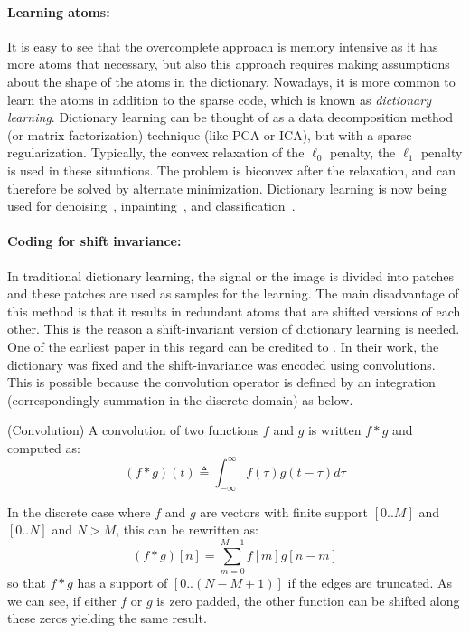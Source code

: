\paragraph{Learning atoms:} It is easy to see that the overcomplete approach is memory intensive as it has more atoms that necessary, but also this approach requires making assumptions about the shape of the atoms in the dictionary. Nowadays, it is more common to learn the atoms in addition to the sparse code, which is known as \emph{dictionary learning}. Dictionary learning can be thought of as a data decomposition method (or matrix factorization) technique (like \ac{PCA} or \ac{ICA}), but with a sparse regularization. Typically, the convex relaxation of the $\ell_0$ penalty, the $\ell_1$ penalty is used in these situations. The problem is biconvex after the relaxation, and can therefore be solved by alternate minimization. Dictionary learning is now being used for denoising~\citep{elad2006image}, inpainting~\citep{mairal2009online}, and classification~\citep{mairal2009supervised}. 

\paragraph{Coding for shift invariance:}
In traditional dictionary learning, the signal or the image is divided into patches and these patches are used as samples for the learning. The main disadvantage of this method is that it results in redundant atoms that are shifted versions of each other. This is the reason a shift-invariant version of dictionary learning is needed. One of the earliest paper in this regard can be credited to \cite{lewicki1999coding}. In their work, the dictionary was fixed and the shift-invariance was encoded using convolutions. 
This is possible because the convolution operator is defined by an integration (correspondingly summation in the discrete domain) as below.
\vspace{\parskip}
%
\begin{definition}{(Convolution)}
A convolution of two functions $f$ and $g$ is written $f * g$ and computed as:
\begin{equation}
(f * g)(t) \triangleq \int_{-\infty}^{\infty} f(\tau)g(t-\tau) d\tau
\end{equation}
\end{definition}

In the discrete case where $f$ and $g$ are vectors with finite support $[0..M]$ and $[0..N]$ and $N > M$, this can be rewritten as:
%
\begin{equation}
(f * g)[n] = \sum_{m=0}^{M-1} f[m]g[n-m]
\end{equation}
%
so that $f * g$ has a support of $[0..(N - M + 1)]$ if the edges are truncated. As we can see, if either $f$ or $g$ is zero padded, the other function can be shifted along these zeros yielding the same result.

